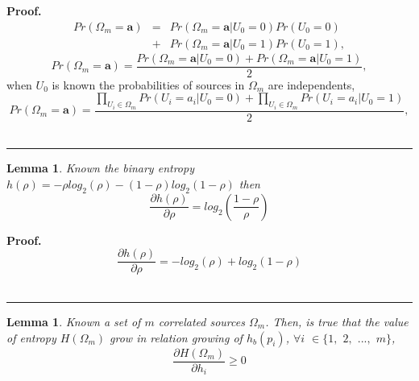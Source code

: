 \documentclass[a4paper,10pt]{article}
\newtheorem{mylemma}[mytheorem]{Lemma}
\newenvironment{myproof}[1][Proof]{\textbf{#1.} }{\ \rule{0.5em}{0.5em}}
\begin{document}
\begin{myproof}
 \label{proof:PrA} 
\begin{equation}\label{eq:PA1}
\begin{matrix}
Pr(\Omega_m=\mathbf{a})&=&Pr(\Omega_m=\mathbf{a}|U_0=0)Pr(U_0=0)\\
~                 &+&Pr(\Omega_m=\mathbf{a}|U_0=1)Pr(U_0=1), 
\end{matrix}
\end{equation}
\begin{equation}\label{eq:PA2}
Pr(\Omega_m=\mathbf{a})=\frac{Pr(\Omega_m=\mathbf{a}|U_0=0)+Pr(\Omega_m=\mathbf{a}|U_0=1)}{2},
\end{equation}
when $U_0$ is known the probabilities of sources in $\Omega_m$ are independents,
\begin{equation}\label{eq:PA3}
Pr(\Omega_m=\mathbf{a})=\frac{\prod \limits_{U_i\in \Omega_m}{Pr(U_i=a_i|U_0=0)}+\prod \limits_{U_i\in \Omega_m}{Pr(U_i=a_i|U_0=1)}}{2},
\end{equation}
\end{myproof}
\begin{mdframed}[style=MDFStyGrayScreen]
\begin{mylemma}
 \label{lemm:dhdrho}
Known the binary entropy $h(\rho)=-\rho log_2(\rho)-(1-\rho) log_2(1-\rho)$ then
\begin{equation}\label{eq:dhdrho1}
 \frac{\partial h(\rho)}{\partial \rho}= log_2 \left( \frac{1-\rho}{\rho} \right )
\end{equation}
\end{mylemma}
\end{mdframed}

\begin{myproof}
 \label{proof:dhdrho} 
\begin{equation}\label{eq:dhdrho2}
 \frac{\partial h(\rho)}{\partial \rho}= - log_2(\rho)+ log_2(1-\rho)
\end{equation}
\end{myproof}
\begin{mdframed}[style=MDFStyGrayScreen]
\begin{mylemma}
 \label{lemm:dH}
Known a set of $m$ correlated  sources  $\Omega_m$. Then, is true that
the value of entropy $H(\Omega_m)$ grow in relation growing of $h_b(p_i)$, 
$\forall i$ $\in \{1,$ $2,$ $...,$ $m\}$,
\begin{equation}\label{eq:dH1}
 \frac{\partial H(\Omega_m)}{\partial h_i} \geq 0
\end{equation}
\end{mylemma}
\end{mdframed}
\end{document}
